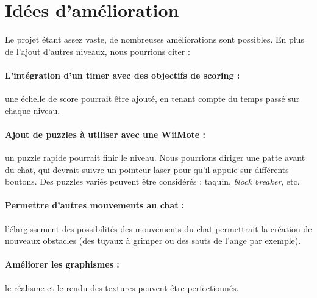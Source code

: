 \documentclass[a4paper,11pt]{article}
\begin{document}
\section{Idées d'amélioration}
Le projet étant assez vaste, de nombreuses améliorations sont possibles. En plus de l'ajout d'autres niveaux, nous pourrions citer : 
\paragraph{L'intégration d'un timer avec des objectifs de scoring :} une échelle de score pourrait être ajouté, en tenant compte du temps passé sur chaque niveau.
\paragraph{Ajout de puzzles à utiliser avec une WiiMote :} un puzzle rapide pourrait finir le niveau. Nous pourrions diriger une patte avant du chat, qui devrait suivre un pointeur laser pour qu'il appuie sur différents boutons. Des puzzles variés peuvent être considérés : taquin, \textit{block breaker}, etc.
\paragraph{Permettre d'autres mouvements au chat :} l'élargissement des possibilités des mouvements du chat permettrait la création de nouveaux obstacles (des tuyaux à grimper ou des sauts de l'ange par exemple).
\paragraph{Améliorer les graphismes :} le réalisme et le rendu des textures peuvent être perfectionnés.
\\
\end{document}
